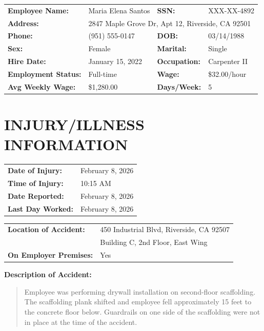 \documentclass[11pt]{article}
\begin{document}
\begin{tabular}{@{}p{4cm}p{5cm}p{2cm}p{3.5cm}@{}}
\textbf{Employee Name:} & Maria Elena Santos & \textbf{SSN:} & XXX-XX-4892 \\
\textbf{Address:} & \multicolumn{3}{l}{2847 Maple Grove Dr, Apt 12, Riverside, CA 92501} \\
\textbf{Phone:} & (951) 555-0147 & \textbf{DOB:} & 03/14/1988 \\
\textbf{Sex:} & Female & \textbf{Marital:} & Single \\
\textbf{Hire Date:} & January 15, 2022 & \textbf{Occupation:} & Carpenter II \\
\textbf{Employment Status:} & Full-time & \textbf{Wage:} & \$32.00/hour \\
\textbf{Avg Weekly Wage:} & \$1,280.00 & \textbf{Days/Week:} & 5 \\
\end{tabular}

\section*{INJURY/ILLNESS INFORMATION}

\begin{tabular}{@{}p{4cm}p{10cm}@{}}
\textbf{Date of Injury:} & February 8, 2026 \\
\textbf{Time of Injury:} & 10:15 AM \\
\textbf{Date Reported:} & February 8, 2026 \\
\textbf{Last Day Worked:} & February 8, 2026 \\
\end{tabular}

\vspace{0.5em}

\begin{tabular}{@{}p{4cm}p{10cm}@{}}
\textbf{Location of Accident:} & 450 Industrial Blvd, Riverside, CA 92507 \\
& Building C, 2nd Floor, East Wing \\
\textbf{On Employer Premises:} & Yes \\
\end{tabular}

\vspace{0.5em}

\textbf{Description of Accident:}
\begin{quote}
Employee was performing drywall installation on second-floor scaffolding. The scaffolding plank shifted and employee fell approximately 15 feet to the concrete floor below. Guardrails on one side of the scaffolding were not in place at the time of the accident.
\end{quote}
\end{document}
